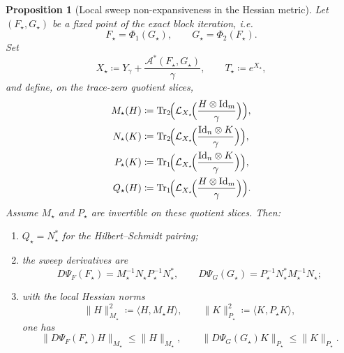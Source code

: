\documentclass[11pt]{article}
\newcommand{\Id}{\mathrm{Id}}
\newcommand{\Trone}{\operatorname{Tr}_{1}}
\newcommand{\Trtwo}{\operatorname{Tr}_{2}}
\newcommand{\eqdef}{\coloneqq}
\newcommand{\dotp}[2]{\langle #1,#2\rangle}
\newcommand{\Aa}{\mathcal{A}}
\theoremstyle{plain}
\newtheorem{proposition}{Proposition}[section]
\begin{document}
\begin{proposition}[Local sweep non-expansiveness in the Hessian metric]
\label{prop:qot-local-hessian-contraction}
Let $(F_\star,G_\star)$ be a fixed point of the exact block iteration, i.e.
\[
F_\star=\Phi_1(G_\star),
\qquad
G_\star=\Phi_2(F_\star).
\]
Set
\[
X_\star \eqdef Y_\gamma + \frac{\Aa^\ast(F_\star,G_\star)}{\gamma},
\qquad
T_\star \eqdef e^{X_\star},
\]
and define, on the trace-zero quotient slices,
\begin{align*}
M_\star(H)
&\eqdef
\Trtwo\!\Bigl(\mathcal L_{X_\star}\!\Bigl(\frac{H \otimes \Id_m}{\gamma}\Bigr)\Bigr),\\
N_\star(K)
&\eqdef
\Trtwo\!\Bigl(\mathcal L_{X_\star}\!\Bigl(\frac{\Id_n \otimes K}{\gamma}\Bigr)\Bigr),\\
P_\star(K)
&\eqdef
\Trone\!\Bigl(\mathcal L_{X_\star}\!\Bigl(\frac{\Id_n \otimes K}{\gamma}\Bigr)\Bigr),\\
Q_\star(H)
&\eqdef
\Trone\!\Bigl(\mathcal L_{X_\star}\!\Bigl(\frac{H \otimes \Id_m}{\gamma}\Bigr)\Bigr).
\end{align*}
Assume $M_\star$ and $P_\star$ are invertible on these quotient slices. Then:
\begin{enumerate}[label=\textnormal{(\roman*)}]
\item $Q_\star=N_\star^\ast$ for the Hilbert--Schmidt pairing;
\item the sweep derivatives are
\[
D\Psi_F(F_\star)=M_\star^{-1}N_\star P_\star^{-1}N_\star^\ast,
\qquad
D\Psi_G(G_\star)=P_\star^{-1}N_\star^\ast M_\star^{-1}N_\star;
\]
\item with the local Hessian norms
\[
\|H\|_{M_\star}^2 \eqdef \dotp{H}{M_\star H},
\qquad
\|K\|_{P_\star}^2 \eqdef \dotp{K}{P_\star K},
\]
one has
\[
\|D\Psi_F(F_\star)H\|_{M_\star}\le \|H\|_{M_\star},
\qquad
\|D\Psi_G(G_\star)K\|_{P_\star}\le \|K\|_{P_\star}.
\]
\end{enumerate}
\end{proposition}
\end{document}
